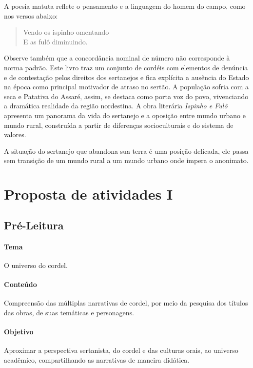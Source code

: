 \documentclass[12pt]{extarticle}
\begin{document}
A poesia matuta reflete o pensamento e a linguagem do homem do campo, 
como nos versos abaixo:  

\begin{verse}
Vendo os ispinho omentando\\
E as fulô diminuindo.\\
\end{verse}
 
Observe também que a concordância nominal de número não corresponde à 
norma padrão. 
Este livro traz um conjunto de cordéis com elementos de denúncia e de 
contestação pelos direitos dos sertanejos e fica explícita a ausência 
do Estado na época como principal motivador de atraso no sertão. A 
população sofria com a seca e Patativa do Assaré, assim, se destaca como 
porta voz do povo, vivenciando a dramática realidade da região nordestina. 
A obra literária \emph{Ispinho e Fulô} apresenta um panorama da vida do 
sertanejo e a oposição entre mundo urbano e mundo rural, construída a 
partir de diferenças socioculturais e do sistema de valores. 
 
A situação do sertanejo que abandona sua terra é uma posição delicada, 
ele passa sem transição de um mundo rural a um mundo urbano onde 
impera o anonimato. 

\section{Proposta de atividades I}

\subsection{Pré-Leitura}

\paragraph{Tema} O universo do cordel.

\paragraph{Conteúdo} Compreensão das múltiplas narrativas de cordel, por 
meio da pesquisa dos títulos das obras, de suas temáticas e personagens. 

\paragraph{Objetivo} Aproximar a perspectiva sertanista, do cordel e das 
culturas orais, ao universo acadêmico, compartilhando as narrativas de 
maneira didática.
\end{document}
